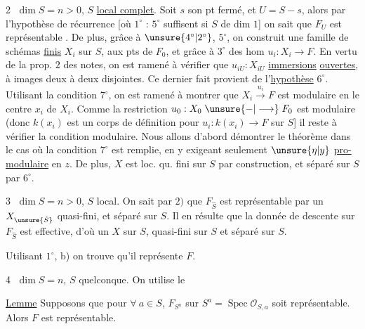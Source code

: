 \textcircled{2} $\dim S=n>0$, $S$ \uline{local complet}. Soit $s$ son pt fermé, \deleted{\unsure{---}} et $U=S-s$, alors par l'hypothèse de récurrence [où \textcircled{$1^\circ$} : \textcircled{$5^\circ$} suffisent si $S$ de dim $1$] on sait que $F_U$ est représentable . De plus, grâce à \textcircled{$\unsure{4^\circ|2^\circ}$}, \textcircled{$5^\circ$}, on construit une famille de schémas \uline{finis} $X_i$ sur $S$,   aux pts de $F_0$, et  grâce à \textcircled{$3^\circ$} des hom $u_i:X_i\longrightarrow F$. En vertu de la prop. $2$ des notes, on est ramené à vérifier que $u_{iU}:X_{iU}$ \uline{immersions} \uline{ouvertes}, à images deux à deux disjointes. Ce dernier fait provient de l'\uline{hypothèse}
\textcircled{$6^\circ$}. Utilisant la condition \textcircled{$7^\circ$}, on est ramené à montrer que $X_i\xrightarrow{u_i}F$ est modulaire en le centre $x_i$ de $X_i$. Comme la restriction $u_0:X_0\mathrel{\unsure{-|\longrightarrow}}F_0$ est modulaire (donc  $k(x_i)$ est un corps de définition pour $u_i:k(x_i)\longrightarrow F$ sur $S$] il reste à vérifier la condition modulaire. Nous allons  d'abord démontrer le théorème dans le cas où la condition $7^\circ$ est remplie, en y exigeant seulement $\unsure{\eta|y}$ \uline{pro-modulaire}  en $z$. De plus, $X$ est loc. qu. fini sur $S$ par construction, et séparé sur $S$ par $6^\circ$.

\textcircled{3} $\dim S=n>0$, $S$ local. On sait par $2)$ que $F_{\hat S}$ est représentable par un $X_{\unsure{\hat S}}$  quasi-fini, et séparé sur $S$. Il en résulte que la donnée de descente  sur $F_{\hat S}$ est effective,  d'où un $X$ sur $S$,  quasi-fini sur $S$ et séparé sur $S$.

Utilisant $1^\circ$, b) on trouve qu'il représente $F$.

\textcircled{4} $\dim S=n$, $S$ quelconque.  On utilise le

\uline{Lemme}  Supposons que pour $\forall\ a\in S$, $F_{S^a}$ sur $S^a=\operatorname{Spec}\mathcal O_{S,a}$ soit représentable. Alors $F$ est représentable.

